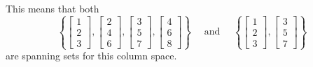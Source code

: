 \documentclass{ximera}
\begin{document}
This means that both 
\begin{equation*}
    \left\{
        \begin{bmatrix}
            1 \\
            2 \\
            3 
        \end{bmatrix}
        ,
        \begin{bmatrix}
            2 \\
            4 \\
            6
        \end{bmatrix}
        ,
        \begin{bmatrix}
            3 \\
            5 \\
            7
        \end{bmatrix}
        ,
        \begin{bmatrix}
            4 \\
            6 \\
            8
        \end{bmatrix}
    \right\}
    \quad \text{ and } \quad 
    \left\{
        \begin{bmatrix}
            1 \\
            2 \\
            3
        \end{bmatrix}
        ,
        \begin{bmatrix}
            3 \\
            5 \\
            7
        \end{bmatrix}
    \right\} 
\end{equation*} are spanning sets for this column space.
\end{document}
